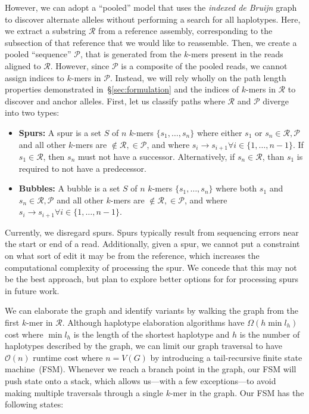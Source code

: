 \documentclass[masters]{ucbthesis}
\begin{document}
However, we can adopt a ``pooled'' model that uses the \emph{indexed de Bruijn} graph to discover alternate
alleles without performing a search for all haplotypes. Here, we extract a substring $\mathcal{R}$ from a
reference assembly, corresponding to the subsection of that reference that we would like to reassemble.
Then, we create a pooled ``sequence'' $\mathcal{P}$, that is generated from the $k$-mers present in
the reads aligned to $\mathcal{R}$. However, since $\mathcal{P}$ is a composite of the pooled reads, we
cannot assign indices to $k$-mers in $\mathcal{P}$. Instead, we will rely wholly on the path length
properties demonstrated in~\S\ref{sec:formulation} and the indices of $k$-mers in $\mathcal{R}$ to
discover and anchor alleles. First, let us classify paths where $\mathcal{R}$ and $\mathcal{P}$ diverge
into two types:

\begin{itemize}
\item \textbf{Spurs:} A spur is a set $S$ of $n$ $k$-mers $\{s_1, \dots, s_n\}$ where either $s_1$ or
$s_n \in \mathcal{R}, \mathcal{P}$ and all other $k$-mers are $\not\in \mathcal{R}, \in \mathcal{P}$,
and where $s_i \rightarrow s_{i + 1} \forall i \in \{1, \dots, n - 1\}$. If $s_1 \in \mathcal{R}$, then $s_n$ must 
not have a successor. Alternatively, if $s_n \in \mathcal{R}$, than $s_1$ is required to not have a
predecessor.
\item \textbf{Bubbles:} A bubble is a set $S$ of $n$ $k$-mers $\{s_1, \dots, s_n\}$ where both $s_1$ and
$s_n \in \mathcal{R}, \mathcal{P}$ and all other $k$-mers are $\not\in \mathcal{R}, \in \mathcal{P}$, and
where $s_i \rightarrow s_{i + 1} \forall i \in \{1, \dots, n - 1\}$.
\end{itemize}

Currently, we disregard spurs. Spurs typically result from sequencing errors near the start or end of a
read. Additionally, given a spur, we cannot put a constraint on what sort of edit it may be from the
reference, which increases the computational complexity of processing the spur. We concede that this
may not be the best approach, but plan to explore better options for for processing spurs in future work.

We can elaborate the graph and identify variants by walking the graph from the first $k$-mer in
$\mathcal{R}$. Although haplotype elaboration algorithms have $\Omega(h \min l_h)$ cost where
$\min l_h$ is the length of the shortest haplotype and $h$ is the number of haplotypes described by the graph, we can limit our graph traversal
to have $\mathcal{O}(n)$ runtime cost where $n = V(G)$ by introducing a tail-recursive finite state machine~(FSM). Whenever we
reach a branch point in the graph, our FSM will push state onto a stack, which allows us---with a few
exceptions---to avoid making multiple traversals through a single $k$-mer in the graph. Our FSM has
the following states:
\end{document}
